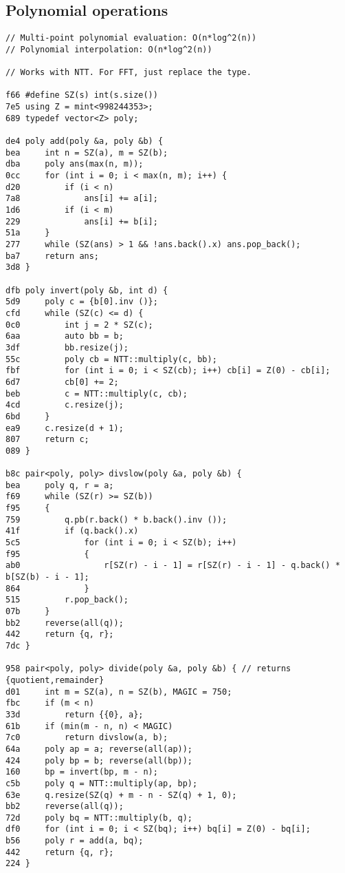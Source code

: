 \documentclass[11pt, a4paper, twoside]{article}
\begin{document}
\subsection{Polynomial operations}
\begin{lstlisting}
// Multi-point polynomial evaluation: O(n*log^2(n))
// Polynomial interpolation: O(n*log^2(n))
 
// Works with NTT. For FFT, just replace the type.

f66 #define SZ(s) int(s.size())
7e5 using Z = mint<998244353>;
689 typedef vector<Z> poly;

de4 poly add(poly &a, poly &b) {
bea     int n = SZ(a), m = SZ(b);
dba     poly ans(max(n, m));
0cc     for (int i = 0; i < max(n, m); i++) {
d20         if (i < n)
7a8             ans[i] += a[i];
1d6         if (i < m)
229             ans[i] += b[i];
51a     }
277     while (SZ(ans) > 1 && !ans.back().x) ans.pop_back();
ba7     return ans;
3d8 }

dfb poly invert(poly &b, int d) {
5d9     poly c = {b[0].inv ()};
cfd     while (SZ(c) <= d) {
0c0         int j = 2 * SZ(c);
6aa         auto bb = b;
3df         bb.resize(j);
55c         poly cb = NTT::multiply(c, bb);
fbf         for (int i = 0; i < SZ(cb); i++) cb[i] = Z(0) - cb[i];
6d7         cb[0] += 2;
beb         c = NTT::multiply(c, cb);
4cd         c.resize(j);
6bd     }
ea9     c.resize(d + 1);
807     return c;
089 }

b8c pair<poly, poly> divslow(poly &a, poly &b) {
bea     poly q, r = a;
f69     while (SZ(r) >= SZ(b))
f95     {
759         q.pb(r.back() * b.back().inv ());
41f         if (q.back().x)
5c5             for (int i = 0; i < SZ(b); i++)
f95             {
ab0                 r[SZ(r) - i - 1] = r[SZ(r) - i - 1] - q.back() * b[SZ(b) - i - 1];
864             }
515         r.pop_back();
07b     }
bb2     reverse(all(q));
442     return {q, r};
7dc }

958 pair<poly, poly> divide(poly &a, poly &b) { // returns {quotient,remainder}
d01     int m = SZ(a), n = SZ(b), MAGIC = 750;
fbc     if (m < n)
33d         return {{0}, a};
61b     if (min(m - n, n) < MAGIC)
7c0         return divslow(a, b);
64a     poly ap = a; reverse(all(ap));
424     poly bp = b; reverse(all(bp));
160     bp = invert(bp, m - n);
c5b     poly q = NTT::multiply(ap, bp);
63e     q.resize(SZ(q) + m - n - SZ(q) + 1, 0);
bb2     reverse(all(q));
72d     poly bq = NTT::multiply(b, q);
df0     for (int i = 0; i < SZ(bq); i++) bq[i] = Z(0) - bq[i];
b56     poly r = add(a, bq);
442     return {q, r};
224 }


\end{lstlisting}
\end{document}
